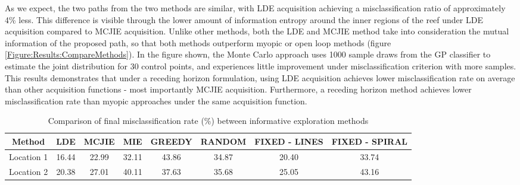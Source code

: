 \documentclass{article}
\begin{document}
		As we expect, the two paths from the two methods are similar, with LDE acquisition achieving a misclassification ratio of approximately 4\% less. This difference is visible through the lower amount of information entropy around the inner regions of the reef under LDE acquisition compared to MCJIE acquisition. Unlike other methods, both the LDE and MCJIE method take into consideration the mutual information of the proposed path, so that both methods outperform myopic or open loop methods (figure \ref{Figure:Results:CompareMethods}). In the figure shown, the Monte Carlo approach uses 1000 sample draws from the GP classifier to estimate the joint distribution for 30 control points, and experiences little improvement under misclassification criterion with more samples. This results demonstrates that under a receding horizon formulation, using LDE acquisition achieves lower misclassification rate on average than other acquisition functions - most importantly MCJIE acquisition. Furthermore, a receding horizon method achieves lower misclassification rate than myopic approaches under the same acquisition function.	

		\begin{table}[t]
			\begin{center}
				\begin{tabular}{ |c||c|c|c|c|c|c|c| }
				\hline
				Method & LDE & MCJIE & MIE & GREEDY & RANDOM & FIXED - LINES & FIXED - SPIRAL \\
				\hline
				Location 1 & 16.44 & 22.99 & 32.11 & 43.86 & 34.87 & 20.40 & 33.74 \\
				Location 2 & 20.38 & 27.01 & 40.11 & 37.63 & 35.68 & 25.05 & 43.16 \\
				\hline
				\end{tabular}
			\end{center}
	  	\caption{Comparison of final misclassification rate (\%) between informative exploration methods}
	  	\label{Table:Results:CompareMethods}			
	  	\end{table}	
	  	
\end{document}
